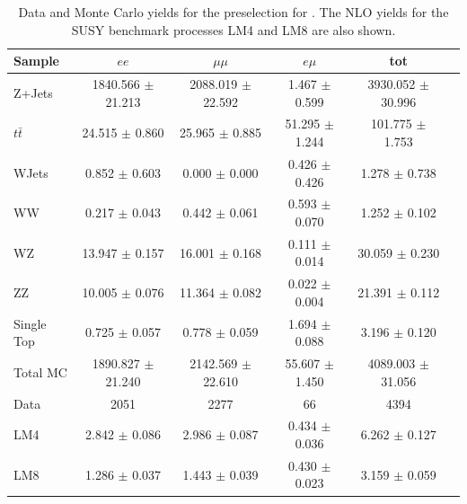 \begin{table}[htb]
\begin{center}
\caption{\label{preselyieldtable} Data and Monte Carlo yields for the preselection for \lumi. 
  The NLO yields for the SUSY benchmark processes LM4 and LM8 are also shown.}
\begin{tabular}{lccccc}
\hline
              Sample   &                $ee$   &            $\mu\mu$   &              $e\mu$   &                 tot  \\
\hline
       Z+Jets & 1840.566 $\pm$ 21.213  &  2088.019 $\pm$ 22.592  &   1.467 $\pm$  0.599  &  3930.052 $\pm$ 30.996 \\ 
   $t\bar{t}$ & 24.515 $\pm$  0.860  &  25.965 $\pm$  0.885  &  51.295 $\pm$  1.244  &  101.775 $\pm$  1.753 \\ 
        WJets &  0.852 $\pm$  0.603  &   0.000 $\pm$  0.000  &   0.426 $\pm$  0.426  &   1.278 $\pm$  0.738 \\ 
           WW &  0.217 $\pm$  0.043  &   0.442 $\pm$  0.061  &   0.593 $\pm$  0.070  &   1.252 $\pm$  0.102 \\ 
           WZ & 13.947 $\pm$  0.157  &  16.001 $\pm$  0.168  &   0.111 $\pm$  0.014  &  30.059 $\pm$  0.230 \\ 
           ZZ & 10.005 $\pm$  0.076  &  11.364 $\pm$  0.082  &   0.022 $\pm$  0.004  &  21.391 $\pm$  0.112 \\ 
   Single Top &  0.725 $\pm$  0.057  &   0.778 $\pm$  0.059  &   1.694 $\pm$  0.088  &   3.196 $\pm$  0.120 \\ 
\hline
     Total MC & 1890.827 $\pm$ 21.240  &  2142.569 $\pm$ 22.610  &  55.607 $\pm$  1.450  &  4089.003 $\pm$ 31.056 \\ 
\hline
         Data &   2051                 &    2277                 &      66               &    4394 \\ 
\hline
          LM4 &  2.842 $\pm$  0.086  &   2.986 $\pm$  0.087  &   0.434 $\pm$  0.036  &   6.262 $\pm$  0.127 \\ 
          LM8 &  1.286 $\pm$  0.037  &   1.443 $\pm$  0.039  &   0.430 $\pm$  0.023  &   3.159 $\pm$  0.059 \\ 


\hline
\end{tabular}
\end{center}
\end{table}



